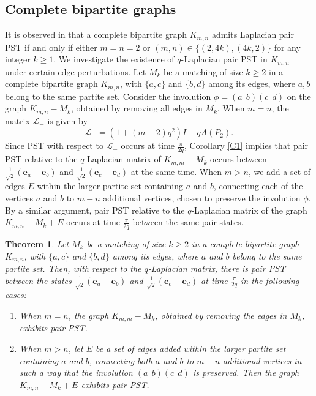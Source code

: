 \documentclass[12pt,a4paper]{article}
\newtheorem{thm}{Theorem}
\begin{document}
\subsection{Complete bipartite graphs}
 It is observed in \cite[Corollary 10.5]{god25} that a complete bipartite graph $K_{m,n}$ admits Laplacian pair PST if and only if either $m=n=2$ or $(m,n) \in \{(2,4k), (4k,2)\}$ for any integer $k \geq 1$.
 We investigate the existence of $q$-Laplacian pair PST in $K_{m,n}$ under certain edge perturbations. Let $M_k$ be a matching of size $k \geq 2$ in a complete bipartite graph $K_{m,n}$, with $\{a,c\}$ and $\{b,d\}$ among its edges, where $a,b$ belong to the same partite set. Consider the involution $\phi = (a~~b)(c~~d)$ on the graph $K_{m,n} - M_k$, obtained by removing all edges in $M_k$. When $m = n$, the matrix $\mathscr{L}_{-}$ is given by
\[
\mathscr{L}_{-} = \left( 1 + (m-2)q^2 \right) I - q A(P_2).
\]
Since PST with respect to $\mathscr{L}_{-}$ occurs at time $\frac{\pi}{2q}$, Corollary \ref{C1} implies that pair PST relative to the $q$-Laplacian matrix of $K_{m,m} - M_k$ occurs between $\frac{1}{\sqrt{2}} \left( \mathbf{e}_a - \mathbf{e}_b \right)$ and $\frac{1}{\sqrt{2}} \left( \mathbf{e}_c - \mathbf{e}_d \right)$ at the same time. When $m > n$, we add a set of edges $E$ within the larger partite set containing $a$ and $b$, connecting each of the vertices $a$ and $b$ to $ m-n$ additional vertices, chosen to preserve the involution $\phi$. By a similar argument, pair PST relative to the $q$-Laplacian matrix of the graph $K_{m,n} - M_k + E$ occurs at time $\frac{\pi}{2q}$ between the same pair states.

\begin{thm}\label{T3}
Let $M_k$ be a matching of size $k \geq 2$ in a complete bipartite graph $K_{m,n}$, with $\{a,c\}$ and $\{b,d\}$ among its edges, where $a$ and $b$ belong to the same partite set. Then, with respect to the $q$-Laplacian matrix, there is pair PST between the states $\frac{1}{\sqrt{2}}(\mathbf{e}_a - \mathbf{e}_b)$ and $\frac{1}{\sqrt{2}}(\mathbf{e}_c - \mathbf{e}_d)$ at time $\frac{\pi}{2q}$ in the following cases:
\begin{enumerate}
    \item When $m = n$, the graph $K_{m,m} - M_k$, obtained by removing the edges in $M_k$, exhibits pair PST.
    \item When $m > n$, let $E$ be a set of edges added within the larger partite set containing $a$ and $b$, connecting both $a$ and $b$ to $m - n$ additional vertices in such a way that the involution $(a~~b)(c~~d)$ is preserved. Then the graph $K_{m,n} - M_k + E$ exhibits pair PST.
\end{enumerate}
\end{thm}
\end{document}
